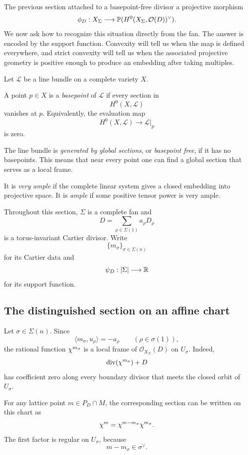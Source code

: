 The previous section attached to a basepoint-free divisor a projective
morphism
\[
\phi_D:X_\Sigma\longrightarrow \mathbb{P}(H^0(X_\Sigma,\mathcal O(D))^\vee).
\]
We now ask how to recognize this situation directly from the fan.
The answer is encoded by the support function. Convexity will tell us
when the map is defined everywhere, and strict convexity will tell us
when the associated projective geometry is positive enough to produce
an embedding after taking multiples.

\begin{agcheatsheet}
Let \(\mathcal L\) be a line bundle on a complete variety \(X\).

A point \(p\in X\) is a \emph{basepoint} of \(\mathcal L\) if every
section in
\[
H^0(X,\mathcal L)
\]
vanishes at \(p\). Equivalently, the evaluation map
\[
H^0(X,\mathcal L)\longrightarrow \mathcal L|_p
\]
is zero.

The line bundle is \emph{generated by global sections}, or
\emph{basepoint free}, if it has no basepoints. This means that near
every point one can find a global section that serves as a local
frame.

It is \emph{very ample} if the complete linear system gives a closed
embedding into projective space. It is \emph{ample} if some positive
tensor power is very ample.
\end{agcheatsheet}

Throughout this section, \(\Sigma\) is a complete fan and
\[
D=\sum_{\rho\in\Sigma(1)}a_\rho D_\rho
\]
is a torus-invariant Cartier divisor. Write
\[
\{m_\sigma\}_{\sigma\in\Sigma(n)}
\]
for its Cartier data and
\[
\psi_D:|\Sigma|\longrightarrow\mathbb{R}
\]
for its support function.

\subsection{The distinguished section on an affine chart}

Let \(\sigma\in\Sigma(n)\). Since
\[
\langle m_\sigma,u_\rho\rangle=-a_\rho
\qquad
(\rho\in\sigma(1)),
\]
the rational function \(\chi^{m_\sigma}\) is a local frame of
\(\mathcal O_{X_\Sigma}(D)\) on \(U_\sigma\). Indeed,
\[
\operatorname{div}(\chi^{m_\sigma})+D
\]
has coefficient zero along every boundary divisor that meets the
closed orbit of \(U_\sigma\).

For any lattice point \(m\in P_D\cap M\), the corresponding section
can be written on this chart as
\[
\chi^{m}
=
\chi^{m-m_\sigma}\chi^{m_\sigma}.
\]
The first factor is regular on \(U_\sigma\), because
\[
m-m_\sigma\in\sigma^\vee.
\]

